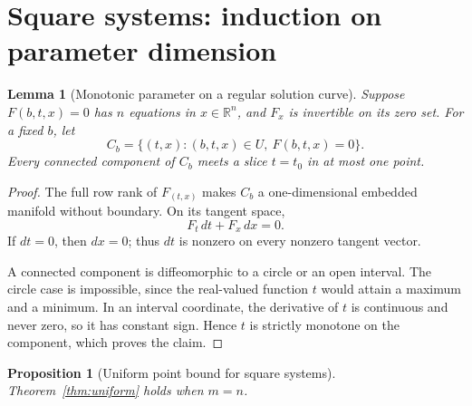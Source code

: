 \documentclass[11pt]{article}
\newtheorem{lemma}[theorem]{Lemma}
\newtheorem{proposition}[theorem]{Proposition}
\theoremstyle{definition}
\theoremstyle{remark}
\newcommand{\R}{\mathbb R}
\begin{document}
\section{Square systems: induction on parameter dimension}
\label{sec:square}

\begin{lemma}[Monotonic parameter on a regular solution curve]
\label{lem:curve}
Suppose \(F(b,t,x)=0\) has \(n\) equations in \(x\in\R^n\), and
\(F_x\) is invertible on its zero set. For a fixed \(b\), let
\[
 C_b=\{(t,x):(b,t,x)\in U,\ F(b,t,x)=0\}.
\]
Every connected component of \(C_b\) meets a slice \(t=t_0\) in at
most one point.
\end{lemma}

\begin{proof}
The full row rank of \(F_{(t,x)}\) makes \(C_b\) a one-dimensional
embedded manifold without boundary. On its tangent space,
\[
 F_t\,dt+F_x\,dx=0.
\]
If \(dt=0\), then \(dx=0\); thus \(dt\) is nonzero on every nonzero
tangent vector.

A connected component is diffeomorphic to a circle or an open
interval. The circle case is impossible, since the real-valued
function \(t\) would attain a maximum and a minimum. In an interval
coordinate, the derivative of \(t\) is continuous and never zero,
so it has constant sign. Hence \(t\) is strictly monotone on the
component, which proves the claim.
\end{proof}

\begin{proposition}[Uniform point bound for square systems]
\label{prop:square}
Theorem~\ref{thm:uniform} holds when \(m=n\).
\end{proposition}
\end{document}
